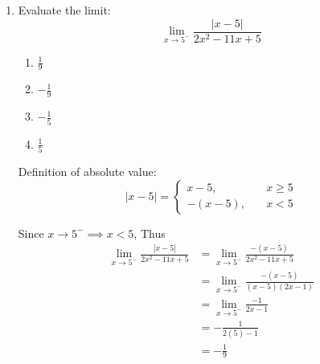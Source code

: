 \begin{enumerate}
    Subtracting equation (2) from equation (1), we have:
    \begin{align*}
        (2a - b - 5) - (2a - 9b + 23) &= 0 \\
        8b - 28 &= 0 \\
        b &= \frac{28}{8} = \frac{7}{2}
    \end{align*}

    Substitute $b = \frac{7}{2}$ back into equation (1):
    \begin{align*}
        2a - b - 5 &= 0 \\
        2a - \frac{7}{2} - 5 &= 0 \\
        2a &= \frac{7}{2} + 5 \\
        2a &= \frac{17}{2} \\
        a &= \frac{17}{4}
    \end{align*}

    Therefore
    \[
        \boxed{a = \frac{17}{4}, \quad b = \frac{7}{2}}
    \]

\item Evaluate the limit: $$\displaystyle \lim_{x \to 5^-}{\frac{|x - 5|}{2x^2 - 11x + 5}}$$
\begin{enumerate}
    \item $\frac{1}{9}$
    \item $-\frac{1}{9}$
    \item $-\frac{1}{5}$
    \item $\frac{1}{5}$
\end{enumerate}
Definition of absolute value:
    \[ \left\lvert x - 5 \right\rvert = 
        \begin{cases}
            x - 5, & \quad x \geq 5 \\
            -(x - 5), & \quad x < 5
        \end{cases}
    \]

Since $x \to 5^- \implies x < 5$, Thus
    \begin{align*}
        \lim_{x \to 5^-}\frac{\left\lvert x - 5\right\rvert}{2x^2 - 11x + 5} &= \lim_{x \to 5^-}\frac{-(x - 5)}{2x^2 - 11x + 5} \\
        &= \lim_{x \to 5^-}\frac{-(x - 5)}{(x - 5)(2x - 1)} \\
        &= \lim_{x \to 5^-}\frac{-1}{2x - 1} \\
        &= -\frac{1}{2(5) - 1} \\
        &= -\frac{1}{9}
    \end{align*}


\end{enumerate}
